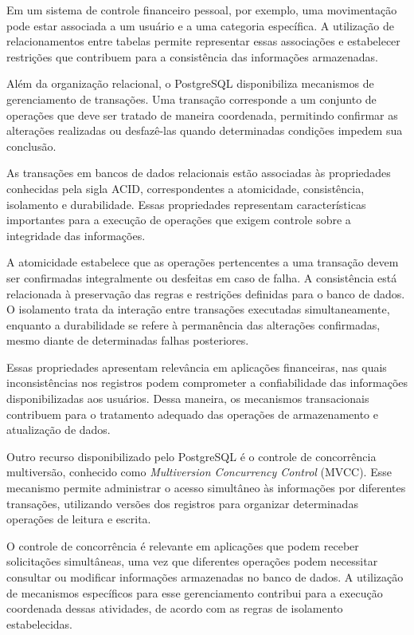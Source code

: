 Em um sistema de controle financeiro pessoal, por exemplo, uma movimentação pode estar associada a um usuário e a uma categoria específica. A utilização de relacionamentos entre tabelas permite representar essas associações e estabelecer restrições que contribuem para a consistência das informações armazenadas.

Além da organização relacional, o PostgreSQL disponibiliza mecanismos de gerenciamento de transações. Uma transação corresponde a um conjunto de operações que deve ser tratado de maneira coordenada, permitindo confirmar as alterações realizadas ou desfazê-las quando determinadas condições impedem sua conclusão.

As transações em bancos de dados relacionais estão associadas às propriedades conhecidas pela sigla ACID, correspondentes a atomicidade, consistência, isolamento e durabilidade. Essas propriedades representam características importantes para a execução de operações que exigem controle sobre a integridade das informações.

A atomicidade estabelece que as operações pertencentes a uma transação devem ser confirmadas integralmente ou desfeitas em caso de falha. A consistência está relacionada à preservação das regras e restrições definidas para o banco de dados. O isolamento trata da interação entre transações executadas simultaneamente, enquanto a durabilidade se refere à permanência das alterações confirmadas, mesmo diante de determinadas falhas posteriores.

Essas propriedades apresentam relevância em aplicações financeiras, nas quais inconsistências nos registros podem comprometer a confiabilidade das informações disponibilizadas aos usuários. Dessa maneira, os mecanismos transacionais contribuem para o tratamento adequado das operações de armazenamento e atualização de dados.

Outro recurso disponibilizado pelo PostgreSQL é o controle de concorrência multiversão, conhecido como \textit{Multiversion Concurrency Control} (MVCC). Esse mecanismo permite administrar o acesso simultâneo às informações por diferentes transações, utilizando versões dos registros para organizar determinadas operações de leitura e escrita.

O controle de concorrência é relevante em aplicações que podem receber solicitações simultâneas, uma vez que diferentes operações podem necessitar consultar ou modificar informações armazenadas no banco de dados. A utilização de mecanismos específicos para esse gerenciamento contribui para a execução coordenada dessas atividades, de acordo com as regras de isolamento estabelecidas.

